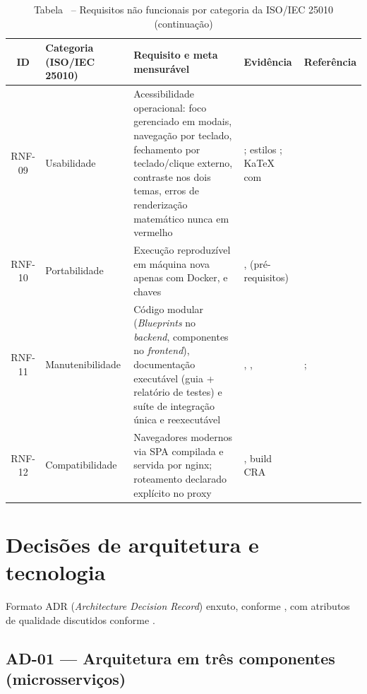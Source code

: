 \begin{table}[H]
\centering
\setlength{\tabcolsep}{2.5pt}
\caption*{Tabela \thetable\ -- Requisitos não funcionais por categoria da ISO/IEC 25010 (continuação)}
\begin{tabularx}{\textwidth}{|C|L{2.3cm}|Y|Y|L{3.3cm}|}
\hline
\textbf{ID} & \textbf{Categoria (ISO/IEC 25010)} & \textbf{Requisito e meta mensurável} & \textbf{Evidência} & \textbf{Referência} \\
\hline
RNF-09 & Usabilidade & Acessibilidade operacional: foco gerenciado em modais, navegação por teclado, fechamento por teclado/clique externo, contraste nos dois temas, erros de renderização matemático nunca em vermelho & \texttt{}; estilos \texttt{}; KaTeX com \texttt{} & \cite{w3c_wcag_22} \\
\hline
RNF-10 & Portabilidade & Execução reproduzível em máquina nova apenas com Docker, \texttt{} e chaves & \texttt{}, \texttt{} (pré-requisitos) & \cite{iso_25010} \\
\hline
RNF-11 & Manuteni\-bilidade & Código modular (\emph{Blueprints} no \emph{backend}, componentes no \emph{frontend}), documentação executável (guia + relatório de testes) e suíte de integração única e reexecutável & , \texttt{},  & \cite{sommerville_2015}; \cite{iso_25010} \\
\hline
RNF-12 & Compati\-bilidade & Navegadores modernos via SPA compilada e servida por nginx; roteamento declarado explícito no proxy & , build CRA & \cite{iso_25010} \\
\hline
\end{tabularx}
\end{table}

\section{Decisões de arquitetura e tecnologia}
\label{ap:req-decisoes}

Formato ADR (\emph{Architecture Decision Record}) enxuto, conforme \cite{nygard_2011}, com atributos de qualidade discutidos conforme \cite{bass_clements_kazman_2021}.

\subsection{AD-01 --- Arquitetura em três componentes (microsserviços)}

